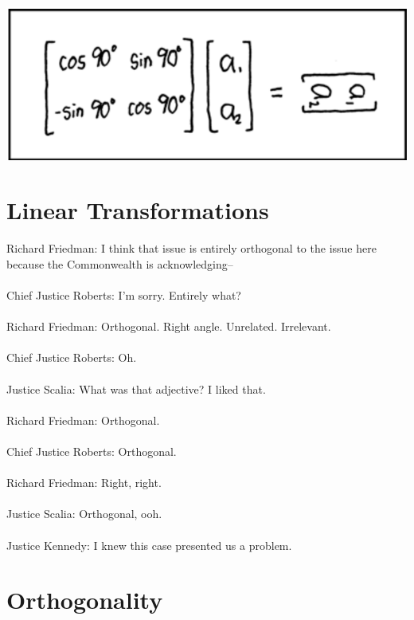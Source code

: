 \documentclass[oneside]{book}
\begin{document}
\begin{savequote}
\includegraphics[scale=0.45]{Graphics/rotationmatrix.png}
\end{savequote}
\chapter{Linear Transformations} \label{chapter:lintrans}

    

\begin{savequote}
    Richard Friedman: I think that issue is entirely orthogonal to the issue here because the Commonwealth is acknowledging--
    \\
    \\
    Chief Justice Roberts: I'm sorry. Entirely what?
    \\
    \\
    Richard Friedman: Orthogonal. Right angle. Unrelated. Irrelevant.
    \\
    \\
    Chief Justice Roberts: Oh.
    \\
    \\
    Justice Scalia: What was that adjective? I liked that.
    \\
    \\
    Richard Friedman: Orthogonal.
    \\
    \\
    Chief Justice Roberts: Orthogonal.
    \\
    \\
    Richard Friedman: Right, right.
    \\
    \\
    Justice Scalia: Orthogonal, ooh.
    \\
    \\
    Justice Kennedy: I knew this case presented us a problem.
\end{savequote}
\chapter{Orthogonality} \label{chapter:ortho}
\end{document}
